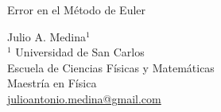 \documentclass[a4paper]{article}
\begin{document}

\Large
 \begin{center}
Error en el Método de Euler\\


\hspace{10pt}

\large
Julio A. Medina$^1$ \\
\hspace{10pt}
\small  
$^1$ Universidad de San Carlos\\
Escuela de Ciencias Físicas y Matemáticas\\
Maestría en Física\\
\href{mailto:julioantonio.medina@gmail.com}{julioantonio.medina@gmail.com}\\

\end{center}

\hspace{10pt}

\normalsize
\end{document}
